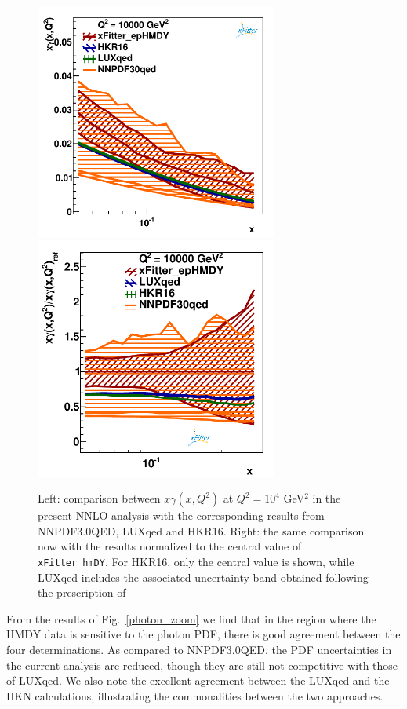 \begin{figure}[t]
  \includegraphics[width=8cm]{figs/photon_comp_10000.pdf}
  \includegraphics[width=8cm]{figs/photon_comp_10000_ratio.pdf} 
\caption{Left: comparison between $x\gamma(x,Q^2)$ at $Q^2=10^4$ GeV$^2$ in the present
  NNLO analysis with the corresponding results from NNPDF3.0QED, LUXqed and HKR16.
  Right: the same comparison now with the results normalized to the central value
  of {\tt xFitter\_hmDY}.
  For  HKR16, only the central value is shown, while LUXqed includes
  the associated uncertainty band obtained following the prescription
  of~\cite{Manohar:2016nzj}
}
\label{photon_zoom} \label{photon_zoom_ratio}
\end{figure}

From the results of Fig.~\ref{photon_zoom} we find that in the region where the HMDY data is
sensitive to the photon PDF, there is good agreement between the four determinations.
%
As compared to NNPDF3.0QED, the PDF uncertainties in the current analysis are reduced, though
they are still not competitive with those of LUXqed.
%
We also note the excellent agreement between the LUXqed and the HKN calculations,
illustrating the commonalities between the two approaches.

